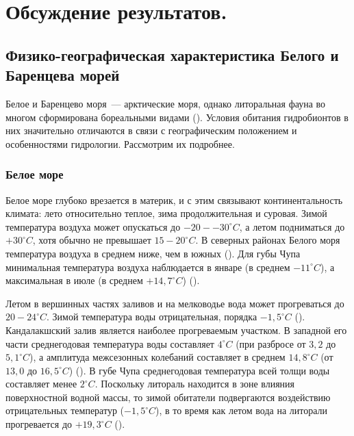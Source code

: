 		\section{Обсуждение результатов.}

	\subsection{Физико-географическая характеристика Белого и Баренцева морей}
Белое и Баренцево моря~--- арктические моря, однако литоральная фауна во многом сформирована бореальными видами (\cite{Zenkevich_1963}).
Условия обитания гидробионтов в них значительно отличаются в связи с географическим положением и особенностями гидрологии.
Рассмотрим их подробнее.

	\subsubsection{Белое море}

Белое море глубоко врезается в материк, и с этим связывают континентальность климата: лето относительно теплое, зима продолжительная и суровая. 
Зимой температура воздуха может опускаться до $-20 - -30^{\circ}C$, а летом подниматься до $+30^{\circ}C$, хотя обычно не превышает $15-20^{\circ}C$. 
В северных районах Белого моря температура воздуха в среднем ниже, чем в южных (\cite{Babkov_Golikov_1984}). 
Для губы Чупа минимальная температура воздуха наблюдается в январе (в среднем $-11^{\circ}C$), а максимальная в июле (в среднем $+14,7^{\circ}C$) (\cite{Babkov_1982}). 

Летом в вершинных частях заливов и на мелководье вода может прогреваться до $20 - 24^{\circ}C$. 
Зимой температура воды отрицательная, порядка $-1,5^{\circ}C$ (\cite{Babkov_Golikov_1984}).
Кандалакшский залив является наиболее прогреваемым участком. 
В западной его части среднегодовая температура воды составляет $4^{\circ}C$ (при разбросе от $3,2$ до $5,1^{\circ}C$), а амплитуда межсезонных колебаний составляет в среднем $14,8^{\circ}C$ (от $13,0$ до $16,5^{\circ}C$) (\cite{Kuznecov_1960}). 
В губе Чупа среднегодовая температура всей толщи воды составляет менее $2^{\circ}C$. 
Поскольку литораль находится в зоне влияния поверхностной водной массы, то зимой обитатели подвергаются воздействию отрицательных температур ($-1,5^{\circ}C$), в то время как летом вода на литорали прогревается до $+19,3^{\circ}C$ (\cite{Babkov_1982}). 

